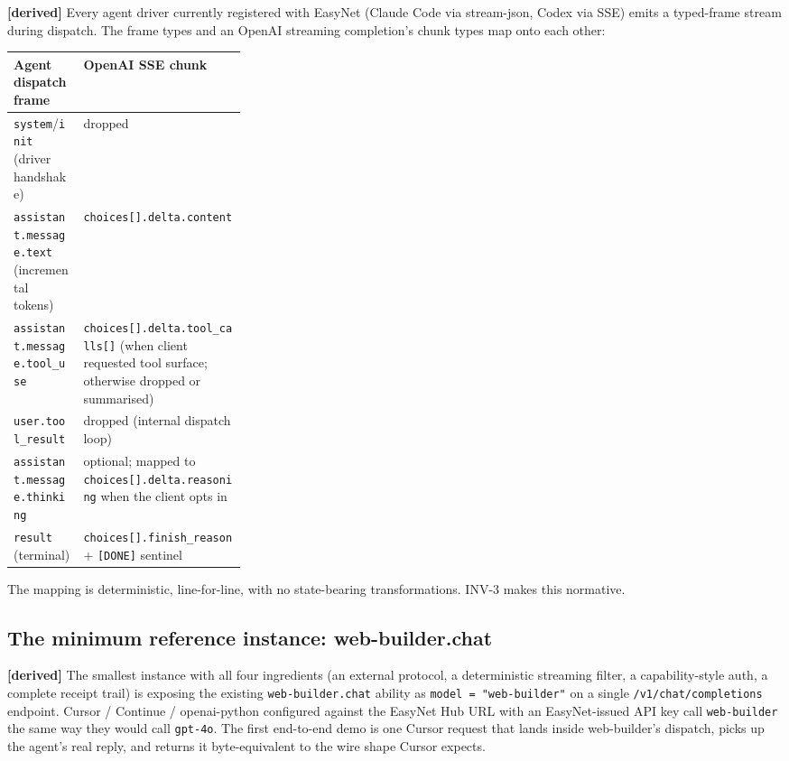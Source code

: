 \documentclass[11pt,a4paper]{article}
\newcommand{\derived}{\textcolor{derivedcolor}{\textbf{[derived]}}\xspace}
\theoremstyle{definition}
\begin{document}
\derived{} Every agent driver currently registered with EasyNet
(Claude Code via stream-json, Codex via SSE) emits a typed-frame
stream during dispatch. The frame types and an OpenAI streaming
completion's chunk types map onto each other:

\begin{center}
\renewcommand{\arraystretch}{1.2}
\begin{tabularx}{\linewidth}{L{0.30\linewidth} X}
\toprule
\textbf{Agent dispatch frame} & \textbf{OpenAI SSE chunk} \\
\midrule
\texttt{system}/\texttt{init} (driver handshake)        & dropped \\
\texttt{assistant.message.text} (incremental tokens)    & \texttt{choices[].delta.content} \\
\texttt{assistant.message.tool\_use}                    & \texttt{choices[].delta.tool\_calls[]} (when client requested tool surface; otherwise dropped or summarised) \\
\texttt{user.tool\_result}                              & dropped (internal dispatch loop) \\
\texttt{assistant.message.thinking}                     & optional; mapped to \texttt{choices[].delta.reasoning} when the client opts in \\
\texttt{result} (terminal)                              & \texttt{choices[].finish\_reason} + \texttt{[DONE]} sentinel \\
\bottomrule
\end{tabularx}
\end{center}

The mapping is deterministic, line-for-line, with no
state-bearing transformations. INV-3 makes this normative.

\subsection{The minimum reference instance: web-builder.chat}

\derived{} The smallest instance with all four ingredients
(an external protocol, a deterministic streaming filter, a
capability-style auth, a complete receipt trail) is exposing the
existing \texttt{web-builder.chat} ability as
\texttt{model = "web-builder"} on a single \texttt{/v1/chat/completions}
endpoint. Cursor / Continue / openai-python configured against
the EasyNet Hub URL with an EasyNet-issued API key call
\texttt{web-builder} the same way they would call
\texttt{gpt-4o}. The first end-to-end demo is one Cursor request
that lands inside web-builder's dispatch, picks up the agent's
real reply, and returns it byte-equivalent to the wire shape
Cursor expects.
\end{document}
